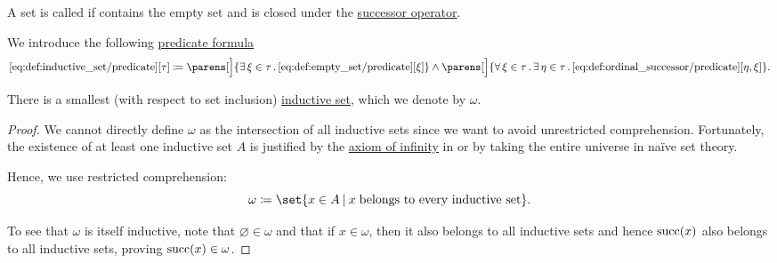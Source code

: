 \begin{definition}\label{def:inductive_set}
  A set is called  if contains the empty set and is closed under the \hyperref[def:ordinal_successor]{successor operator}.

  We introduce the following \hyperref[rem:predicate_formula]{predicate formula}
  \begin{equation*}\taglabel[\op{IsInductive}]{eq:def:inductive_set/predicate}
    \ref{eq:def:inductive_set/predicate}[\tau] \coloneqq
      \parens[\Big]{ \qexists {\xi \in \tau} \ref{eq:def:empty_set/predicate}[\xi] }
      \wedge
      \parens[\Big]{ \qforall {\xi \in \tau} \qexists {\eta \in \tau} \ref{eq:def:ordinal_successor/predicate}[\eta, \xi] }.
  \end{equation*}
\end{definition}

\begin{proposition}\label{thm:smallest_inductive_set_existence}
  There is a smallest (with respect to set inclusion) \hyperref[def:inductive_set]{inductive set}, which we denote by \( \omega \).
\end{proposition}
\begin{proof}
  We cannot directly define \( \omega \) as the intersection of all inductive sets since we want to avoid unrestricted comprehension. Fortunately, the existence of at least one inductive set \( A \) is justified by the \hyperref[def:zfc/infinity]{axiom of infinity} in  or by taking the entire universe in na\"ive set theory.

  Hence, we use restricted comprehension:
  \begin{equation*}
    \omega \coloneqq \set{ x \in A \given x \T{belongs to every inductive set} }.
  \end{equation*}

  To see that \( \omega \) is itself inductive, note that \( \varnothing \in \omega \) and that if \( x \in \omega \), then it also belongs to all inductive sets and hence \( \operatorname{succ}(x) \) also belongs to all inductive sets, proving \( \operatorname{succ}(x) \in \omega \).
\end{proof}

